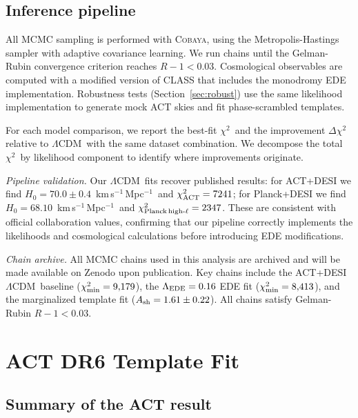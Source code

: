 \documentclass[onecolumn,showpacs,preprintnumbers,amsmath,amssymb,prd]{revtex4-2}
\newcommand{\lcdm}{$\Lambda$CDM}
\newcommand{\chisq}{$\chi^2$}
\newcommand{\kms}{km\,s$^{-1}$\,Mpc$^{-1}$}
\begin{document}
\subsection{Inference pipeline}

All MCMC sampling is performed with \textsc{Cobaya}, using the Metropolis-Hastings 
sampler with adaptive covariance learning. We run chains until the Gelman-Rubin 
convergence criterion reaches $R - 1 < 0.03$. Cosmological observables are computed 
with a modified version of \textsc{CLASS} that includes the monodromy EDE implementation. 
Robustness tests (Section~\ref{sec:robust}) use the same likelihood implementation 
to generate mock ACT skies and fit phase-scrambled templates.

For each model comparison, we report the best-fit \chisq\ and the improvement 
$\Delta\chi^2$ relative to \lcdm\ with the same dataset combination. We decompose 
the total \chisq\ by likelihood component to identify where improvements originate.

\emph{Pipeline validation.} Our \lcdm\ fits recover published results: for 
ACT+DESI we find $H_0 = 70.0 \pm 0.4$~\kms\ and $\chi^2_{\rm ACT} = 7241$; for 
Planck+DESI we find $H_0 = 68.10$~\kms\ and $\chi^2_{\rm Planck\,high\text{-}\ell} 
= 2347$. These are consistent with official collaboration values, confirming 
that our pipeline correctly implements the likelihoods and cosmological 
calculations before introducing EDE modifications.

\emph{Chain archive.} All MCMC chains used in this analysis are archived and 
will be made available on Zenodo upon publication. Key chains include the 
ACT+DESI \lcdm\ baseline ($\chi^2_{\rm min} = 9{,}179$), the 
$\Lambda_{\rm EDE} = 0.16$ EDE fit ($\chi^2_{\rm min} = 8{,}413$), and 
the marginalized template fit ($A_{\rm sh} = 1.61 \pm 0.22$). All chains 
satisfy Gelman-Rubin $R - 1 < 0.03$.

\section{ACT DR6 Template Fit}
\label{sec:act}

\subsection{Summary of the ACT result}
\end{document}
